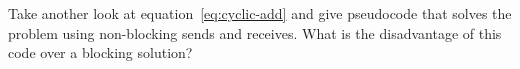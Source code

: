   Take another look at equation~\eqref{eq:cyclic-add} and give pseudocode that
  solves the problem using non-blocking sends and receives. What is
  the disadvantage of this code over a blocking solution?
